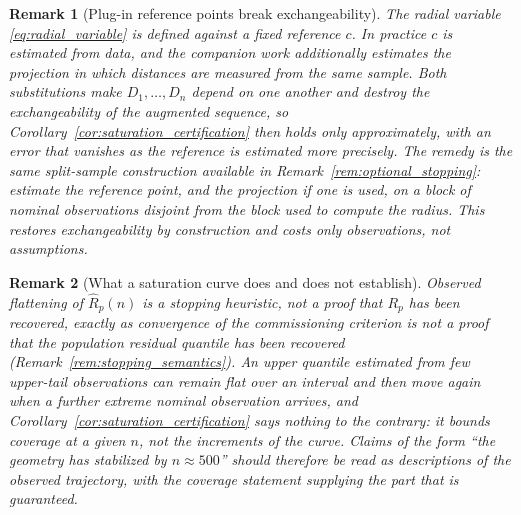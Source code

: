 \documentclass[a4paper]{cas-sc}
\newtheorem{remark}{Remark}
\begin{document}
\begin{remark}[Plug-in reference points break exchangeability]
\label{rem:plugin_centroid}
The radial variable \eqref{eq:radial_variable} is defined against a fixed
reference \(c\). In practice \(c\) is estimated from data, and the companion
work additionally estimates the projection in which distances are measured
from the same sample. Both substitutions make \(D_1,\ldots,D_n\) depend on one
another and destroy the exchangeability of the augmented sequence, so
Corollary~\ref{cor:saturation_certification} then holds only approximately,
with an error that vanishes as the reference is estimated more precisely. The
remedy is the same split-sample construction available in
Remark~\ref{rem:optional_stopping}: estimate the reference point, and the
projection if one is used, on a block of nominal observations disjoint from the
block used to compute the radius. This restores exchangeability by
construction and costs only observations, not assumptions.
\end{remark}

\begin{remark}[What a saturation curve does and does not establish]
\label{rem:saturation_semantics}
Observed flattening of \(\widehat R_p(n)\) is a stopping heuristic, not a
proof that \(R_p\) has been recovered, exactly as convergence of the
commissioning criterion is not a proof that the population residual quantile
has been recovered (Remark~\ref{rem:stopping_semantics}). An upper quantile
estimated from few upper-tail observations can remain flat over an interval and
then move again when a further extreme nominal observation arrives, and
Corollary~\ref{cor:saturation_certification} says nothing to the contrary: it
bounds coverage at a given \(n\), not the increments of the curve. Claims of
the form ``the geometry has stabilized by \(n\approx 500\)'' should therefore be
read as descriptions of the observed trajectory, with the coverage statement
supplying the part that is guaranteed.
\end{remark}
\end{document}
